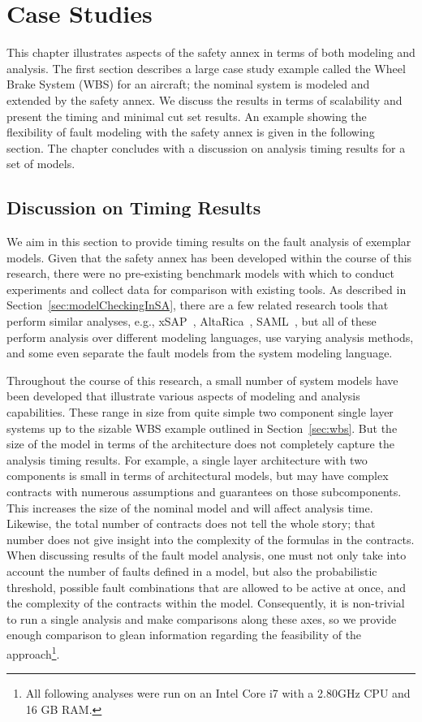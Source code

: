 \chapter{Case Studies}
\label{chap:caseStudies}
This chapter illustrates aspects of the safety annex in terms of both modeling and analysis. The first section describes a large case study example called the Wheel Brake System (WBS) for an aircraft; the nominal system is modeled and extended by the safety annex. We discuss the results in terms of scalability and present the timing and minimal cut set results. An example showing the flexibility of fault modeling with the safety annex is given in the following section. The chapter concludes with a discussion on analysis timing results for a set of models. 




\section{Discussion on Timing Results}
\label{sec:timing}
We aim in this section to provide timing results on the fault analysis of exemplar models. Given that the safety annex has been developed within the course of this research, there were no pre-existing benchmark models with which to conduct experiments and collect data for comparison with existing tools. As described in Section~\ref{sec:modelCheckingInSA}, there are a few related research tools that perform similar analyses, e.g., xSAP~\cite{DBLP:conf/tacas/BittnerBCCGGMMZ16}, AltaRica~\cite{signoret1998altarica}, SAML~\cite{Gudemann:2010:FQQ:1909626.1909813}, but all of these perform analysis over different modeling languages, use varying analysis methods, and some even separate the fault models from the system modeling language.

Throughout the course of this research, a small number of system models have been developed that illustrate various aspects of modeling and analysis capabilities. These range in size from quite simple two component single layer systems up to the sizable WBS example outlined in Section~\ref{sec:wbs}. But the size of the model in terms of the architecture does not completely capture the analysis timing results. For example, a single layer architecture with two components is small in terms of architectural models, but may have complex contracts with numerous assumptions and guarantees on those subcomponents. This increases the size of the nominal model and will affect analysis time. Likewise, the total number of contracts does not tell the whole story; that number does not give insight into the complexity of the formulas in the contracts. When discussing results of the fault model analysis, one must not only take into account the number of faults defined in a model, but also the probabilistic threshold, possible fault combinations that are allowed to be active at once, and the complexity of the contracts within the model. Consequently, it is non-trivial to run a single analysis and make comparisons along these axes, so we provide enough comparison to glean information regarding the feasibility of the approach\footnote{All following analyses were run on an Intel Core i7 with a 2.80GHz CPU and 16 GB RAM. }.

